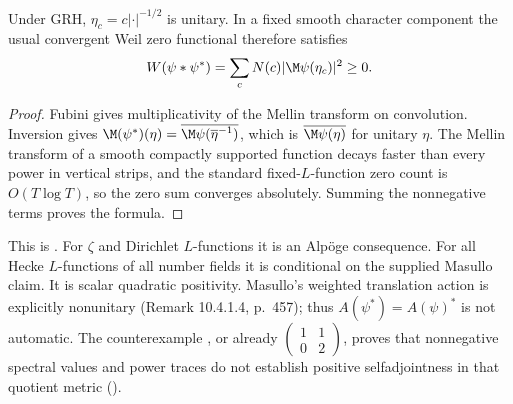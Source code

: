 Under GRH, $\eta_c=c|\cdot|^{-1/2}$ is unitary. In a fixed smooth character component the usual convergent Weil zero functional therefore satisfies
\begin{equation}\label{eq:weilsquares}
 W(\psi*\psi^*)=\sum_cN(c)|\M\psi(\eta_c)|^2\ge0.
\end{equation}
\begin{proof}
Fubini gives multiplicativity of the Mellin transform on convolution. Inversion gives
$\M(\psi^*)(\eta)=\overline{\M\psi(\overline\eta^{-1})}$, which is $\overline{\M\psi(\eta)}$ for unitary $\eta$. The Mellin transform of a smooth compactly supported function decays faster than every power in vertical strips, and the standard fixed-$L$-function zero count is $O(T\log T)$, so the zero sum converges absolutely. Summing the nonnegative terms proves the formula.
\end{proof}
This is . For $\zeta$ and Dirichlet $L$-functions it is an Alp\"oge consequence. For all Hecke $L$-functions of all number fields it is conditional on the supplied Masullo claim. It is scalar quadratic positivity. Masullo's weighted translation action is explicitly nonunitary (Remark 10.4.1.4, p.~457); thus $A(\psi^*)=A(\psi)^*$ is not automatic. The counterexample , or already $\left(\begin{smallmatrix}1&1\\0&2\end{smallmatrix}\right)$, proves that nonnegative spectral values and power traces do not establish positive selfadjointness in that quotient metric ().


